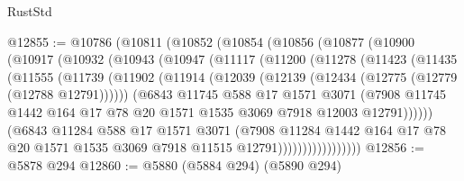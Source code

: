\begin{lexlean}{RustStd}
\begin{coremodule}
{{@12855 := @10786
    (@10811
      (@10852
        (@10854
          (@10856
            (@10877
              (@10900
                (@10917
                  (@10932
                    (@10943
                      (@10947
                        (@11117
                          (@11200
                            (@11278
                              (@11423
                                (@11435
                                  (@11555
                                    (@11739
                                      (@11902
                                        (@11914
                                          (@12039
                                            (@12139 (@12434 (@12775 (@12779 (@12788 @12791))))))
                                          (@6843
                                            @11745
                                            @588
                                            @17
                                            @1571
                                            @3071
                                            (@7908
                                              @11745
                                              @1442
                                              @164
                                              @17
                                              @78
                                              @20
                                              @1571
                                              @1535
                                              @3069
                                              @7918
                                              @12003
                                              @12791))))))
                                  (@6843
                                    @11284
                                    @588
                                    @17
                                    @1571
                                    @3071
                                    (@7908
                                      @11284
                                      @1442
                                      @164
                                      @17
                                      @78
                                      @20
                                      @1571
                                      @1535
                                      @3069
                                      @7918
                                      @11515
                                      @12791)))))))))))))))))
@12856 := @5878 @294
@12860 := @5880 (@5884 @294) (@5890 @294)
}}
\end{coremodule}
\end{lexlean}
